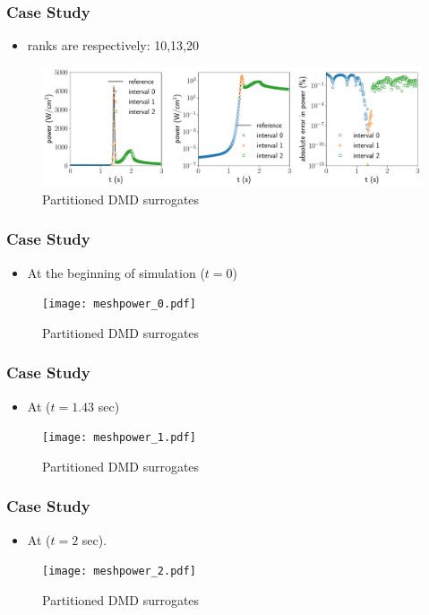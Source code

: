 \documentclass[fleqn]{beamer}
\begin{document}

\begin{frame}
\frametitle{Case Study}
\begin{itemize}
 \item ranks are respectively: 10,13,20
\end{itemize}

\begin{figure}[ht]
\includegraphics[scale=0.3]{corepower.pdf}
\caption{Partitioned DMD surrogates}
\end{figure}
\end{frame}

\begin{frame}
\frametitle{Case Study}
\begin{itemize}
	\item At the beginning of simulation ($t=0$)
\end{itemize}
\begin{figure}
\texttt{[image: meshpower\_0.pdf]}
\caption{Partitioned DMD surrogates}
\end{figure}
\end{frame}

\begin{frame}
\frametitle{Case Study}
\begin{itemize}
	\item At ($t=1.43$ sec)
\end{itemize}
\begin{figure}[ht]
\texttt{[image: meshpower\_1.pdf]}
\caption{Partitioned DMD surrogates}
\end{figure}
\end{frame}

\begin{frame}
\frametitle{Case Study}
\begin{itemize}
	\item At ($t=2$ sec).
\end{itemize}
\begin{figure}
\texttt{[image: meshpower\_2.pdf]}
\caption{Partitioned DMD surrogates}
\end{figure}
\end{frame}
\end{document}
